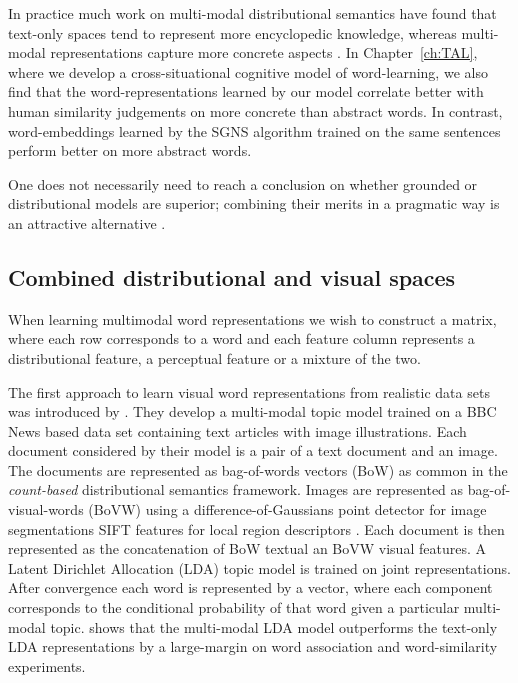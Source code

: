 In practice much work on multi-modal distributional semantics have found that text-only spaces tend to
represent more encyclopedic knowledge, whereas multi-modal representations capture more concrete aspects
\citep{andrews2009integrating,baroni2008concepts}. In Chapter~\ref{ch:TAL}, where we develop
a cross-situational cognitive model of word-learning, we also find that the word-representations learned by
our model correlate better with human similarity judgements on more concrete than abstract words.
In contrast, word-embeddings learned by the SGNS algorithm trained on the same sentences
perform better on more abstract words.

One does not necessarily need to reach a conclusion on whether grounded or distributional
models are superior;  combining their merits in a
pragmatic way is an attractive alternative \citep{riordan2011redundancy}.


\subsection{Combined distributional and visual spaces}
\label{sec:distvis}

When learning multimodal word representations we wish to construct a matrix,
where each row 
corresponds to a word and each feature column
represents a distributional feature, a perceptual feature or a mixture of the two.

The first approach to learn visual word representations from realistic data sets
was introduced by \cite{feng2010visual}. They develop a multi-modal topic model trained on a
BBC News based data set containing text articles with image illustrations.
Each document considered by their model is a pair of a text document  and  an image.
The documents are represented as bag-of-words vectors (BoW) as common in the
\emph{count-based} distributional semantics framework. Images are represented
as bag-of-visual-words (BoVW)  \citep{csurka2004visual} using a
difference-of-Gaussians point detector for image segmentations
SIFT features for local region descriptors \citep{lowe1999object}.
Each document is then represented as the concatenation of BoW textual an BoVW visual features.
A Latent Dirichlet Allocation (LDA) \citep{blei2003latent} topic model is trained
on joint representations. After convergence each word is represented by a vector,
where each component corresponds to the conditional probability of that word given
a particular multi-modal topic. \cite{feng2010visual}
shows that the multi-modal LDA model outperforms the text-only LDA representations by a
large-margin on word association and word-similarity experiments.

